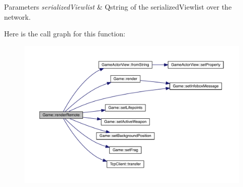 \begin{DoxyParams}{Parameters}
{\em serialized\+Viewlist} & Qstring of the serialized\+Viewlist over the network. \\
\hline
\end{DoxyParams}


Here is the call graph for this function\+:\nopagebreak
\begin{figure}[H]
\begin{center}
\leavevmode
\includegraphics[width=350pt]{class_game_aab513bbe5db45b1f9dba205d0ddec74e_cgraph}
\end{center}
\end{figure}


